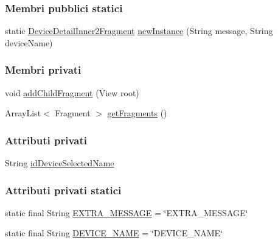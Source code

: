 \subsubsection*{Membri pubblici statici}
\begin{DoxyCompactItemize}
\item 
static \hyperlink{classit_1_1unibo_1_1torsello_1_1bluetoothpositioning_1_1fragment_1_1DeviceDetailInner2Fragment}{Device\+Detail\+Inner2\+Fragment} \hyperlink{classit_1_1unibo_1_1torsello_1_1bluetoothpositioning_1_1fragment_1_1DeviceDetailInner2Fragment_a27471a2d140a8dd11636ef23ffc20657_a27471a2d140a8dd11636ef23ffc20657}{new\+Instance} (String message, String device\+Name)
\end{DoxyCompactItemize}
\subsubsection*{Membri privati}
\begin{DoxyCompactItemize}
\item 
void \hyperlink{classit_1_1unibo_1_1torsello_1_1bluetoothpositioning_1_1fragment_1_1DeviceDetailInner2Fragment_af61900b6821dff2086e86d646c990870_af61900b6821dff2086e86d646c990870}{add\+Child\+Fragment} (View root)
\item 
Array\+List$<$ Fragment $>$ \hyperlink{classit_1_1unibo_1_1torsello_1_1bluetoothpositioning_1_1fragment_1_1DeviceDetailInner2Fragment_a74ebcb936381919cfe4f3542585203c4_a74ebcb936381919cfe4f3542585203c4}{get\+Fragments} ()
\end{DoxyCompactItemize}
\subsubsection*{Attributi privati}
\begin{DoxyCompactItemize}
\item 
String \hyperlink{classit_1_1unibo_1_1torsello_1_1bluetoothpositioning_1_1fragment_1_1DeviceDetailInner2Fragment_a84cd6ba00a3c2e8b7a53cac62c73f1b5_a84cd6ba00a3c2e8b7a53cac62c73f1b5}{id\+Device\+Selected\+Name}
\end{DoxyCompactItemize}
\subsubsection*{Attributi privati statici}
\begin{DoxyCompactItemize}
\item 
static final String \hyperlink{classit_1_1unibo_1_1torsello_1_1bluetoothpositioning_1_1fragment_1_1DeviceDetailInner2Fragment_a5093b051b0d458a870b6eef51b088e7d_a5093b051b0d458a870b6eef51b088e7d}{E\+X\+T\+R\+A\+\_\+\+M\+E\+S\+S\+A\+GE} = \char`\"{}E\+X\+T\+R\+A\+\_\+\+M\+E\+S\+S\+A\+GE\char`\"{}
\item 
static final String \hyperlink{classit_1_1unibo_1_1torsello_1_1bluetoothpositioning_1_1fragment_1_1DeviceDetailInner2Fragment_aa28d537983d4cf578120a9c51eb2b0bb_aa28d537983d4cf578120a9c51eb2b0bb}{D\+E\+V\+I\+C\+E\+\_\+\+N\+A\+ME} = \char`\"{}D\+E\+V\+I\+C\+E\+\_\+\+N\+A\+ME\char`\"{}
\end{DoxyCompactItemize}


